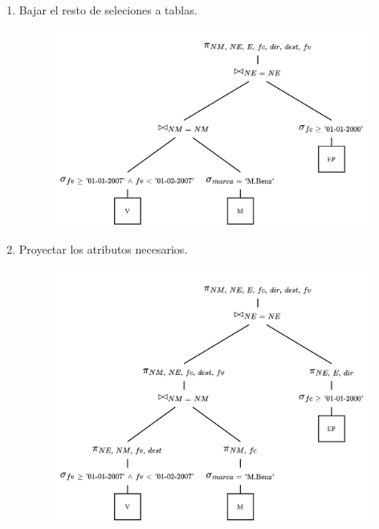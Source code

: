 \documentclass{templateNote}
\begin{document}
\begin{itemize}
\begin{enumerate}
        \item Bajar el resto de seleciones a tablas.
        \begin{figure}[H]
            \centering
            \includegraphics[width=\textwidth]{img/E6-Paso-5.png}
        \end{figure}

        \newpage
        \item Proyectar los atributos necesarios.
        \begin{figure}[H]
            \centering
            \includegraphics[width=\textwidth]{img/E6-Paso-6.png}
        \end{figure}
    \end{enumerate}
\end{itemize}
\newpage
\end{document}
